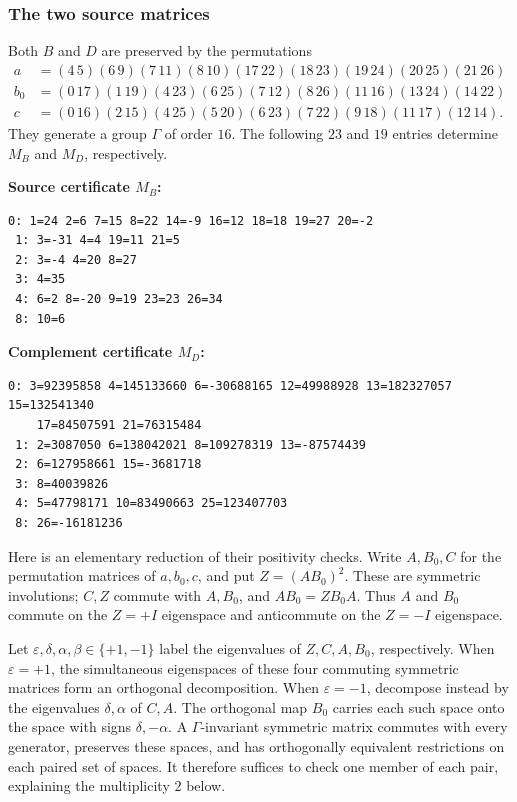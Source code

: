 \subsubsection{The two source matrices}

Both $B$ and $D$ are preserved by the permutations
\begin{align*}
 a&=(4\,5)(6\,9)(7\,11)(8\,10)(17\,22)(18\,23)(19\,24)(20\,25)(21\,26)\\
 b_0&=(0\,17)(1\,19)(4\,23)(6\,25)(7\,12)(8\,26)(11\,16)(13\,24)(14\,22)\\
 c&=(0\,16)(2\,15)(4\,25)(5\,20)(6\,23)(7\,22)(9\,18)(11\,17)(12\,14).
\end{align*}
They generate a group $\Gamma$ of order $16$. The following $23$ and $19$
entries determine $M_B$ and $M_D$, respectively.

\noindent\textbf{Source certificate $M_B$:}
\begin{Verbatim}[fontsize=\scriptsize,baselinestretch=1.03]
 0: 1=24 2=6 7=15 8=22 14=-9 16=12 18=18 19=27 20=-2
 1: 3=-31 4=4 19=11 21=5
 2: 3=-4 4=20 8=27
 3: 4=35
 4: 6=2 8=-20 9=19 23=23 26=34
 8: 10=6
\end{Verbatim}
\noindent\textbf{Complement certificate $M_D$:}
\begin{Verbatim}[fontsize=\scriptsize,baselinestretch=1.03]
 0: 3=92395858 4=145133660 6=-30688165 12=49988928 13=182327057 15=132541340
    17=84507591 21=76315484
 1: 2=3087050 6=138042021 8=109278319 13=-87574439
 2: 6=127958661 15=-3681718
 3: 8=40039826
 4: 5=47798171 10=83490663 25=123407703
 8: 26=-16181236
\end{Verbatim}

Here is an elementary reduction of their positivity checks. Write
$A,B_0,C$ for the permutation matrices of $a,b_0,c$, and put $Z=(AB_0)^2$.
These are symmetric involutions; $C,Z$ commute with $A,B_0$, and
$AB_0=ZB_0A$. Thus $A$ and $B_0$ commute on the $Z=+I$ eigenspace
and anticommute on the $Z=-I$ eigenspace.

Let $\varepsilon,\delta,\alpha,\beta\in\{+1,-1\}$ label the eigenvalues
of $Z,C,A,B_0$, respectively. When $\varepsilon=+1$, the simultaneous
eigenspaces of these four commuting symmetric matrices form an orthogonal
decomposition. When $\varepsilon=-1$, decompose instead by the
eigenvalues $\delta,\alpha$ of $C,A$. The orthogonal map $B_0$ carries
each such space onto the space with signs $\delta,-\alpha$.
A $\Gamma$-invariant symmetric matrix commutes with every generator,
preserves these spaces, and has orthogonally equivalent restrictions
on each paired set of spaces. It therefore suffices to check one member
of each pair, explaining the multiplicity $2$ below.

